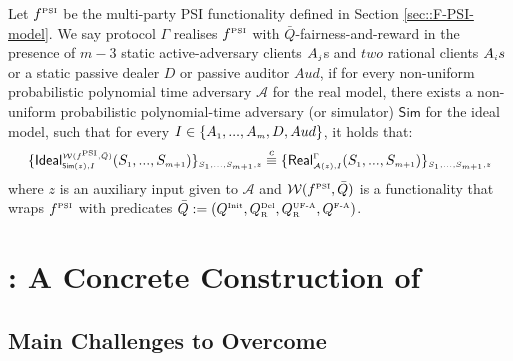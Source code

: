
\vs

\begin{definition}[\ep]\label{def::PSI-Q-fair-reward}
Let $f^{\scriptscriptstyle \text{PSI}}$ be the multi-party PSI functionality defined in Section \ref{sec::F-PSI-model}. We say  protocol $\Gamma$ realises  $f^{\scriptscriptstyle \text{PSI}}$ with $\bar Q$-fairness-and-reward in the presence of $m-3$ static active-adversary clients $A_{\scriptscriptstyle j}$s and $two$ rational clients $A_{\scriptscriptstyle i}s$ or a static passive dealer  $D$ or passive auditor $Aud$, if for every non-uniform probabilistic polynomial time adversary $\mathcal{A}$ for the real model, there exists a non-uniform probabilistic polynomial-time adversary (or simulator) $\mathsf{Sim}$ for the ideal model, such that for every $I\in \{A_{\scriptscriptstyle 1},...,A_{\scriptscriptstyle m}, D, Aud\}$, it holds that: 
%
\begin{equation*}
\{\mathsf {Ideal}^{\scriptscriptstyle \mathcal{W}(f^{\scriptscriptstyle \text{PSI}}, \bar Q)}_{\scriptscriptstyle \mathsf{Sim}(z), I}(S_{\scriptscriptstyle 1},..., S_{\scriptscriptstyle m+1})\}_{\scriptscriptstyle S_{\scriptscriptstyle 1},..., S_{\scriptscriptstyle m+1},z}\stackrel{c}{\equiv} \{\mathsf{Real}_{\scriptscriptstyle \mathcal{A}(z), I}^{\scriptscriptstyle \Gamma}(S_{\scriptscriptstyle 1},..., S_{\scriptscriptstyle m+1}) \}_{\scriptscriptstyle S_{\scriptscriptstyle 1},..., S_{\scriptscriptstyle m+1},z}
\end{equation*}
where  $z$ is an auxiliary input given to $\mathcal{A}$ and  $\mathcal{W}(f^{\scriptscriptstyle \text{PSI}}, \bar Q)$ is a functionality that wraps $f^{\scriptscriptstyle \text{PSI}}$ with predicates $\bar Q:=(Q^{\scriptscriptstyle \text{Init}},  Q^{\scriptscriptstyle \text{Del}}_{\scriptscriptstyle\text{R}}, Q^{\scriptscriptstyle \text{UF-A}}_{\scriptscriptstyle \text{R}}, Q^{\scriptscriptstyle \text{F-A}})$. 
  \end{definition}




\vs
\vs

\section{\withRew: A Concrete Construction of \ep}

\vs

\subsection{Main Challenges to Overcome}

